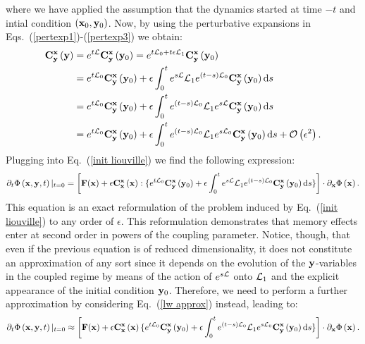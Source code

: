 \documentclass[12pt]{article}
\begin{document}
where we have applied the assumption that the dynamics started at time $-t$ and intial condition $(\mathbf{x}_0,\mathbf{y}_0)$. Now, by using the perturbative expansions in Eqs.~(\ref{pertexp1})-(\ref{pertexp3}) we obtain:
\begin{align}
   \mathbf{C}_{\mathbf{y}}^{\mathbf{x}}\left(\mathbf{y} \right) &= e^{t\mathcal{L}}\mathbf{C}_{\mathbf{y}}^{\mathbf{x}}\left(\mathbf{y}_0 \right)=e^{t\mathcal{L}_0+t\epsilon \mathcal{L}_1}	\mathbf{C}_{\mathbf{y}}^{\mathbf{x}}\left(\mathbf{y}_0 \right) \\ \label{exact expansion1} &= e^{t\mathcal{L}_0}\mathbf{C}_{\mathbf{y}}^{\mathbf{x}}\left(\mathbf{y}_0 \right)+\epsilon\int_{0}^te^{s\mathcal{L}}\mathcal{L}_1e^{(t-s)\mathcal{L}_0}\mathbf{C}_{\mathbf{y}}^{\mathbf{x}}\left(\mathbf{y}_0 \right)\mathrm{d} s\\ \label{exact expansion2} &= e^{t\mathcal{L}_0}\mathbf{C}_{\mathbf{y}}^{\mathbf{x}}\left(\mathbf{y}_0 \right)+\epsilon\int_{0}^te^{(t-s)\mathcal{L}_0}\mathcal{L}_1e^{s\mathcal{L}}\mathbf{C}_{\mathbf{y}}^{\mathbf{x}}\left(\mathbf{y}_0 \right)\mathrm{d} s \\\label{lw approx}&= e^{t\mathcal{L}_0}\mathbf{C}_{\mathbf{y}}^{\mathbf{x}}\left(\mathbf{y}_0 \right)+\epsilon\int_{0}^te^{(t-s)\mathcal{L}_0}\mathcal{L}_1e^{s\mathcal{L}_0}\mathbf{C}_{\mathbf{y}}^{\mathbf{x}}\left(\mathbf{y}_0 \right)\mathrm{d} s + \mathcal{O}\left(\epsilon^2\right).
\end{align}
 Plugging into Eq.~(\ref{init liouville}) we find the following expression:
\begin{equation}\label{time zero liouville}
		\partial _t \Phi \left( \mathbf{x} , \mathbf{y} , t \right)|_{t=0} = \left[ \mathbf{F}(\mathbf{x}) + \epsilon \mathbf{C}_{\mathbf{x}}^{\mathbf{x}}\left(\mathbf{x} \right):\{ e^{t\mathcal{L}_0}\mathbf{C}_{\mathbf{y}}^{\mathbf{x}}\left(\mathbf{y}_0 \right)+\epsilon\int_{0}^te^{s\mathcal{L}}\mathcal{L}_1e^{(t-s)\mathcal{L}_0}\mathbf{C}_{\mathbf{y}}^{\mathbf{x}}\left(\mathbf{y}_0 \right)\mathrm{d} s \}  \right]\cdot \partial _{\mathbf{x}}\Phi \left(\mathbf{x} \right).
\end{equation}
This equation is an exact reformulation of the problem induced by Eq.~(\ref{init liouville}) to any order of $\epsilon$. This reformulation demonstrates that memory effects enter at second order in powers of the coupling parameter. Notice, though, that even if the previous equation is of reduced dimensionality, it does not constitute an approximation of any sort since it depends on the evolution of the $\mathbf{y}$-variables in the coupled regime by means of the action of $e^{s\mathcal{L}}$ onto $\mathcal{L}_1$ and the explicit appearance of the initial condition $\mathbf{y}_0$. Therefore, we need to perform a further approximation by considering Eq.~(\ref{lw approx}) instead, leading to:
\begin{equation}
\partial _t \Phi \left( \mathbf{x} , \mathbf{y} , t \right)|_{t=0} \approx \left[ \mathbf{F}(\mathbf{x}) + \epsilon \mathbf{C}_{\mathbf{x}}^{\mathbf{x}}\left(\mathbf{x} \right)\{ e^{t\mathcal{L}_0}\mathbf{C}_{\mathbf{y}}^{\mathbf{x}}\left(\mathbf{y}_0 \right)+\epsilon\int_{0}^te^{(t-s)\mathcal{L}_0}\mathcal{L}_1e^{s\mathcal{L}_0}\mathbf{C}_{\mathbf{y}}^{\mathbf{x}}\left(\mathbf{y}_0 \right)\mathrm{d} s \}  \right]\cdot \partial _{\mathbf{x}}\Phi \left(\mathbf{x} \right).
\end{equation}
\end{document}
